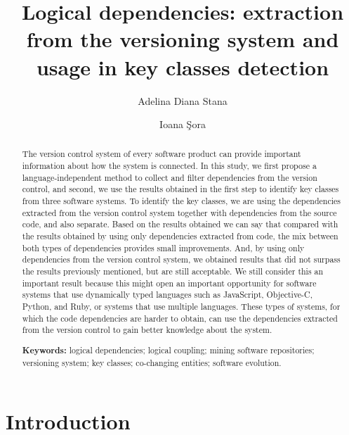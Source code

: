 \documentclass[runningheads]{comsis2}
\title{Logical dependencies: extraction from the versioning system and usage in key classes detection}
\author{Adelina Diana Stana\inst{1} \and Ioana Şora\inst{1}}
\institute{
 Politehnica University, Piaţa Victoriei Nr. 2, ; 300006 Timişoara, jud. Timiş, România\\
  \email{stana.adelina.diana@gmail.com; ioana.sora@cs.upt.ro}
}
\begin{document}
\maketitle

\begin{abstract}
The version control system of every software product can provide important information about how the system is connected.
In this study, we first propose a language-independent method to collect and filter dependencies from the version control, and second, we use the results obtained in the first step to identify key classes from three software systems. To identify the key classes, we are using the dependencies extracted from the version control system together with dependencies from the source code, and also separate. Based on the results obtained we can say that compared with the results obtained by using only dependencies extracted from code, the mix between both types of dependencies provides small improvements. And, by using only dependencies from the version control system, we obtained results that did not surpass the results previously mentioned, but are still acceptable.
We still consider this an important result because this might open an important opportunity for software systems that use dynamically typed languages such as JavaScript, Objective-C, Python, and Ruby, or systems that use multiple languages. These types of systems, for which the code dependencies are harder to obtain, can use the dependencies extracted from the version control to gain better knowledge about the system.
  
\vspace{6pt}\textbf{Keywords:} logical dependencies; logical coupling; mining software repositories; versioning system; key classes; co-changing entities; software evolution.
\end{abstract}


\section{Introduction}
\end{document}
